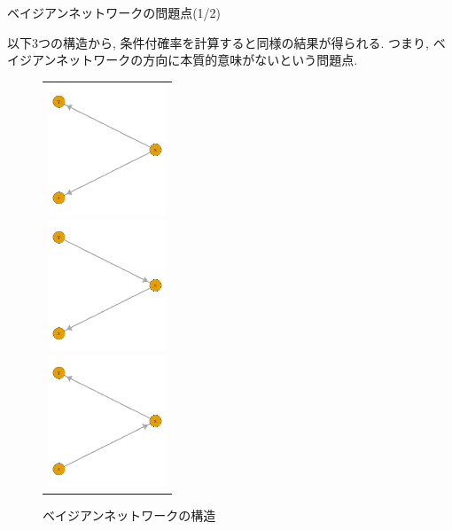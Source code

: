 \documentclass[dvipdfmx]{beamer}
\begin{document}
\begin{frame}{ベイジアンネットワークの問題点(1/2)}

以下3つの構造から, 条件付確率を計算すると同様の結果が得られる. つまり, ベイジアンネットワークの方向に本質的意味がないという問題点.

\begin{figure}[H]
\begin{tabular}{c}
\begin{minipage}{0.33\hsize}
\begin{center}
\includegraphics[clip, width = 3.5cm]{data/BN1.png}
\end{center}
\end{minipage}
\begin{minipage}{0.33\hsize}
\begin{center}
\includegraphics[clip, width = 3.5cm]{data/BN2.png}
\end{center}
\end{minipage}
\begin{minipage}{0.33\hsize}
\begin{center}
\includegraphics[clip, width = 3.5cm]{data/BN3.png}
\end{center}
\end{minipage}
\end{tabular}
\vspace{-0.5zh}
\caption{ベイジアンネットワークの構造}
\label{fig:BN}
\end{figure}

\end{frame}
\end{document}
